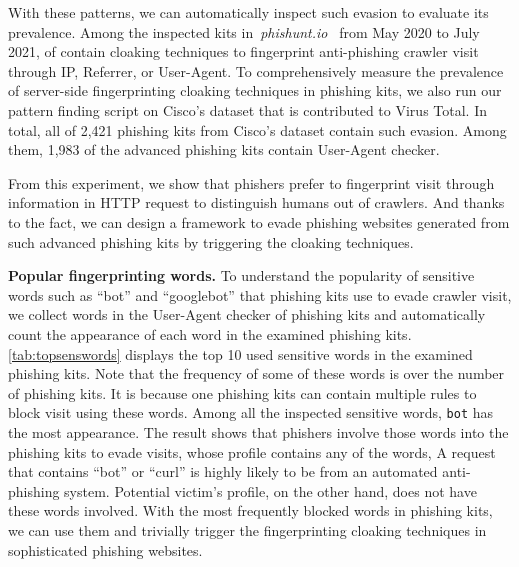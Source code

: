 With these patterns, we can automatically inspect such evasion to evaluate its prevalence.
Among the inspected kits in~\emph{phishunt.io}~\cite{phishunt} from May 2020 to July 2021, \fpphishingkit of \totalphishingkit contain cloaking techniques to fingerprint anti-phishing crawler visit through IP, Referrer, or User-Agent.
To comprehensively measure the prevalence of server-side fingerprinting cloaking techniques in phishing kits,
we also run our pattern finding script on Cisco's dataset that is contributed to Virus Total.
In total, all of 2,421 phishing kits from Cisco's dataset contain such evasion.
Among them, 1,983 of the advanced phishing kits contain User-Agent checker.

From this experiment,
we show that phishers prefer to fingerprint visit through information in HTTP request to distinguish humans out of crawlers.
And thanks to the fact, 
we can design a framework to evade phishing websites generated from such advanced phishing kits by triggering the cloaking techniques.



\noindent
\textbf{Popular fingerprinting words.}
To understand the popularity of sensitive words such as ``bot'' and ``googlebot'' that phishing kits use to evade crawler visit,
we collect \numsenswords words in the User-Agent checker of phishing kits and automatically count the appearance of each word in the examined phishing kits.
\autoref{tab:topsenswords} displays the top 10 used sensitive words in the examined phishing kits.
Note that the frequency of some of these words is over the number of phishing kits.
It is because one phishing kits can contain multiple rules to block visit using these words.
Among all the inspected sensitive words, \texttt{bot} has the most appearance.
The result shows that phishers involve those words into the phishing kits to evade visits, whose profile contains any of the words,
A request that contains ``bot'' or ``curl'' is highly likely to be from an automated anti-phishing system.
Potential victim's profile, on the other hand, does not have these words involved.
With the most frequently blocked words in phishing kits, we can use them and trivially trigger the fingerprinting cloaking techniques in sophisticated phishing websites.


\topsenswords